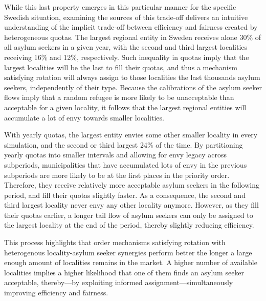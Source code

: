 \documentclass[12pt,fleqn]{article}
\begin{document}
While this last property emerges in this particular manner for the specific Swedish situation, examining the sources of this trade-off delivers an intuitive understanding of the implicit trade-off between efficiency and fairness created by heterogeneous quotas. The largest regional entity in Sweden receives alone 30\% of all asylum seekers in a given year, with the second and third largest localities receiving 16\% and 12\%, respectively. Such inequality in quotas imply that the largest localities will be the last to fill their quotas, and thus a mechanism satisfying rotation will always assign to those localities the last thousands asylum seekers, independently of their type. Because the calibrations of the asylum seeker flows imply that a random refugee is more likely to be unacceptable than acceptable for a given locality, it follows that the largest regional entities will accumulate a lot of envy towards smaller localities.

With yearly quotas, the largest entity envies some other smaller locality in every simulation, and the second or third largest 24\% of the time. By partitioning yearly quotas into smaller intervals and allowing for envy legacy across subperiods, municipalities that have accumulated lots of envy in the previous subperiods are more likely to be at the first places in the priority order. Therefore, they receive relatively more acceptable asylum seekers in the following period, and fill their quotas slightly faster. As a consequence, the second and third largest locality never envy any other locality anymore. However, as they fill their quotas earlier, a longer tail flow of asylum seekers can only be assigned to the largest locality at the end of the period, thereby slightly reducing efficiency.

This process highlights that order mechanisms satisfying rotation with heterogenous locality-asylum seeker synergies perform better the longer a large enough amount of localities remains in the market. A higher number of available localities implies a higher likelihood that one of them finds an asylum seeker acceptable, thereby---by exploiting informed assignment---simultaneously improving efficiency and fairness.
\end{document}
